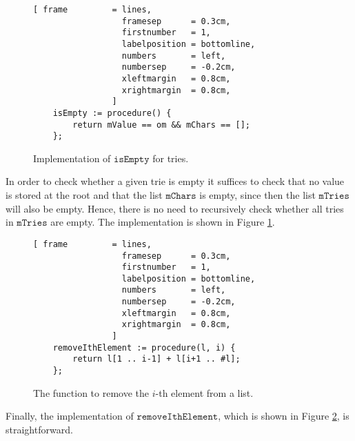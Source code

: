 \begin{figure}[!ht]
\centering
\begin{Verbatim}[ frame         = lines, 
                  framesep      = 0.3cm, 
                  firstnumber   = 1,
                  labelposition = bottomline,
                  numbers       = left,
                  numbersep     = -0.2cm,
                  xleftmargin   = 0.8cm,
                  xrightmargin  = 0.8cm,
                ]
    isEmpty := procedure() {
        return mValue == om && mChars == [];
    };
\end{Verbatim}
\vspace*{-0.3cm}
\caption{Implementation of $\mathtt{isEmpty}$ for tries.}
\label{fig:trie.stlx-isEmpty}
\end{figure}

In order to check whether a given trie is empty it suffices to check that no value is stored at the root
and that the list $\mathtt{mChars}$ is empty, since then the list $\mathtt{mTries}$ will also be empty.  Hence,
there is no need to recursively check whether all tries in $\mathtt{mTries}$ are empty.  
The implementation is shown in Figure \ref{fig:trie.stlx-isEmpty}.

\begin{figure}[!ht]
\centering
\begin{Verbatim}[ frame         = lines, 
                  framesep      = 0.3cm, 
                  firstnumber   = 1,
                  labelposition = bottomline,
                  numbers       = left,
                  numbersep     = -0.2cm,
                  xleftmargin   = 0.8cm,
                  xrightmargin  = 0.8cm,
                ]
    removeIthElement := procedure(l, i) {
        return l[1 .. i-1] + l[i+1 .. #l];
    };
\end{Verbatim}
\vspace*{-0.3cm}
\caption{The function to remove the $i$-th element from a list.}
\label{fig:trie.stlx-removeIthElement}
\end{figure}

Finally, the implementation of $\mathtt{removeIthElement}$, which is shown in Figure
\ref{fig:trie.stlx-removeIthElement}, is straightforward. 

